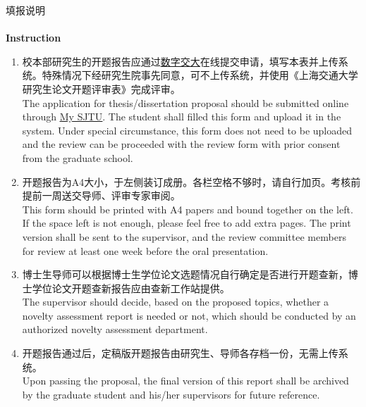 \documentclass[zihao=-4,a4paper]{ctexart}
\begin{document}
\clearpage


\begin{center}
    \vspace*{0.5cm}
    {\heiti 填\quad 报\quad 说\quad 明}\\~\\
    {\bfseries Instruction}
\end{center}

\begin{enumerate}
    \item {\fangsong 校本部研究生的开题报告应通过\href{http://my.sjtu.edu.cn/}{\color{blue}\underline{数字交大}}在线提交申请，填写本表并上传系统。特殊情况下经研究生院事先同意，可不上传系统，并使用《上海交通大学研究生论文开题评审表》完成评审。}\\[0.5\baselineskip]
          The application for thesis/dissertation proposal should be submitted online through \href{http://my.sjtu.edu.cn/}{\color{blue}\underline{My SJTU}}. The student shall filled this form and upload it in the system. Under special circumstance, this form does not need to be uploaded and the review can be proceeded with the review form with prior consent from the graduate school.

    \item {\fangsong 开题报告为A4大小，于左侧装订成册。各栏空格不够时，请自行加页。考核前提前一周送交导师、评审专家审阅。}\\[0.5\baselineskip]
          This form should be printed with A4 papers and bound together on the left. If the space left is not enough, please feel free to add extra pages. The print version shall be sent to the supervisor, and the review committee members for review at least one week before the oral presentation.

    \item {\fangsong 博士生导师可以根据博士生学位论文选题情况自行确定是否进行开题查新，博士学位论文开题查新报告应由查新工作站提供。}\\[0.5\baselineskip]
          The supervisor should decide, based on the proposed topics, whether a novelty assessment report is needed or not, which should be conducted by an authorized novelty assessment department.

    \item {\fangsong 开题报告通过后，定稿版开题报告由研究生、导师各存档一份，无需上传系统。}\\[0.5\baselineskip]
          Upon passing the proposal, the final version of this report shall be archived by the graduate student and his/her supervisors for future reference.


\end{enumerate}
\end{document}
